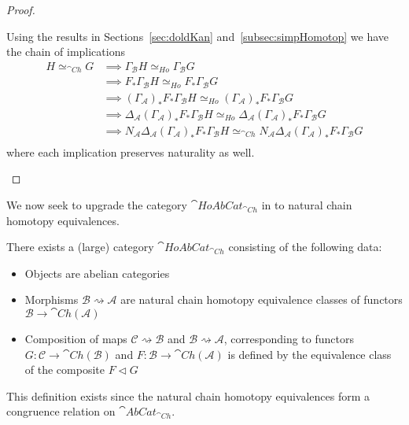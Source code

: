 \begin{proof}
\begin{itemize}
\begin{equation*}
        \end{equation*}
        Using the results in Sections~\ref{sec:doldKan} and~\ref{subsec:simpHomotop} we have the chain of implications
        \begin{align*}
            H \simeq_{\cat{Ch}}G &\implies \Gamma_\mathcal{B}H \simeq_{Ho} \Gamma_\mathcal{B}G \\
            &\implies F_*\Gamma_\mathcal{B}H \simeq_{Ho} F_*\Gamma_\mathcal{B}G \\
            &\implies (\Gamma_\mathcal{A})_*F_*\Gamma_\mathcal{B}H \simeq_{Ho} (\Gamma_\mathcal{A})_*F_*\Gamma_\mathcal{B}G \\
            &\implies \Delta_\mathcal{A}(\Gamma_\mathcal{A})_*F_*\Gamma_\mathcal{B}H \simeq_{Ho} \Delta_\mathcal{A}(\Gamma_\mathcal{A})_*F_*\Gamma_\mathcal{B}G \\
            &\implies N_\mathcal{A}\Delta_\mathcal{A}(\Gamma_\mathcal{A})_*F_*\Gamma_\mathcal{B}H \simeq_{\cat{Ch}} N_\mathcal{A}\Delta_\mathcal{A}(\Gamma_\mathcal{A})_*F_*\Gamma_\mathcal{B}G \\
        \end{align*}
        where each implication preserves naturality as well.
    \end{itemize}
\end{proof}


We now seek to upgrade the category $\cat{HoAbCat}_{\cat{Ch}}$ in \cite{BJORT} to natural chain homotopy equivalences.

\begin{defn}[label=defn:HoAbCat]{}
    There exists a (large) category $\cat{HoAbCat}_{\cat{Ch}}$ consisting of the following data:
    \begin{itemize}
        \item Objects are abelian categories
        \item Morphisms $\mathcal{B}\rightsquigarrow \mathcal{A}$ are natural chain homotopy equivalence classes of functors $\mathcal{B}\rightarrow \cat{Ch}(\mathcal{A})$
        \item Composition of maps $\mathcal{C}\rightsquigarrow \mathcal{B}$ and $\mathcal{B}\rightsquigarrow \mathcal{A}$, corresponding to functors $G:\mathcal{C}\rightarrow \cat{Ch}(\mathcal{B})$ and $F:\mathcal{B}\rightarrow \cat{Ch}(\mathcal{A})$ is defined by the equivalence class of the composite $F\lhd G$
    \end{itemize}
\end{defn}

This definition exists since the natural chain homotopy equivalences form a congruence relation on $\cat{AbCat}_{\cat{Ch}}$.

